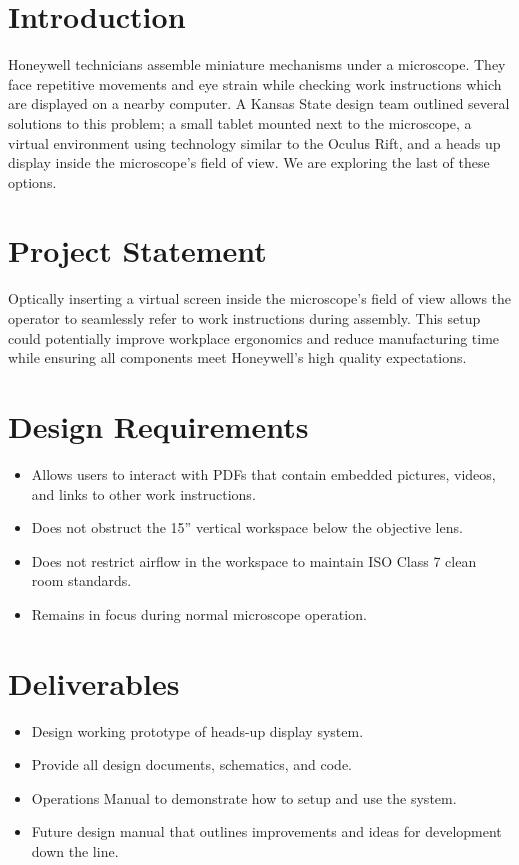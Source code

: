 \documentclass[12pt,a4paper]{article}
\begin{document}
\section{Introduction}
Honeywell technicians assemble miniature mechanisms under a microscope. They face repetitive movements and eye strain while checking work instructions which are displayed on a nearby computer. A Kansas State design team outlined several solutions to this problem; a small tablet mounted next to the microscope, a virtual environment using technology similar to the Oculus Rift, and a heads up display inside the microscope’s field of view. We are exploring the last of these options. 





\section{Project Statement}
Optically inserting a virtual screen inside the microscope’s field of view allows the operator to seamlessly refer to work instructions during assembly. This setup could potentially improve workplace ergonomics and reduce manufacturing time while ensuring all components meet Honeywell’s high quality expectations. 

\section{Design Requirements}

\begin{itemize}
	\item Allows users to interact with PDFs that contain embedded pictures, videos, and links to other work instructions.
	\item Does not obstruct the 15” vertical workspace below the objective lens.
	\item Does not restrict airflow in the workspace to maintain ISO Class 7 clean room standards.
	\item Remains in focus during normal microscope operation.
\end{itemize}

\section{Deliverables}
\begin{itemize}
	\item Design working prototype of heads-up display system.
	\item Provide all design documents, schematics, and code.
	\item Operations Manual to demonstrate how to setup and use the system.
	\item Future design manual that outlines improvements and ideas for development down the line.
\end{itemize}
\end{document}
